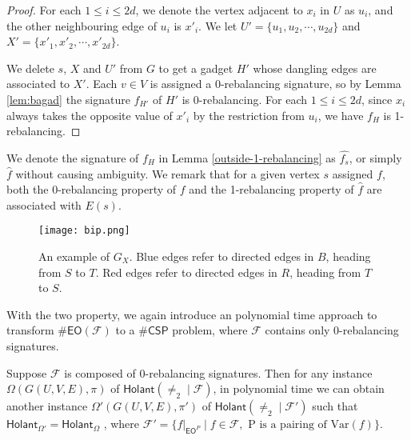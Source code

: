 \documentclass[a4paper,UKenglish,cleveref, autoref, thm-restate]{lipics-v2021}
\newcommand{\hol}[0]{\textsf{Holant}}
\newcommand{\eo}[0]{\textsf{EO}}
\newcommand{\csp}[0]{\textsf{CSP}}
\newcommand{\eom}[1][\text{M}]{\textsf{EO}^{#1}}
\newcommand{\ba}[1][0]{{{#1}-rebalancing}}
\begin{document}
\begin{proof}
For each $1\le i\le 2d$, we denote the vertex adjacent to $x_i$ in $U$ as $u_i$, and the other neighbouring edge of $u_i$ is $x'_i$. We let $U'=\{u_1,u_2, \cdots, u_{2d}\}$ and $X'=\{x'_1,x'_2, \cdots, x'_{2d}\}$.

We delete $s$, $X$ and $U'$ from $G$ to get a gadget $H'$ whose dangling edges are associated to $X'$. Each $v \in V$ is assigned a 0-rebalancing signature, so by Lemma \ref{lem:bagad} the signature $f_{H'}$ of $H'$ is \ba[0]. 
For each $1\le i\le 2d$, since $x_i$ always takes the opposite value of $x'_i$ by the restriction from $u_i$, we have $f_H$ is \ba[1].
\end{proof}


We denote the signature of $f_H$ in Lemma \ref{outside-1-rebalancing} as $\hat{f_s}$, or simply $\hat{f}$ without causing ambiguity.
We remark that for a given vertex $s$ assigned $f$, both the 0-rebalancing property of $f$ and the 1-rebalancing property of $\hat{f}$ are associated with $E(s)$. 



\begin{figure}
            \centering
            \texttt{[image: bip.png]}
            \caption{An example of $G_X$. Blue edges refer to directed edges in $B$, heading from $S$ to $T$. Red edges refer to directed edges in $R$, heading from $T$ to $S$.}
            \label{fig:bip}
        \end{figure}


With the two property, we again introduce an polynomial time approach to transform $\#\eo(\mathcal{F})$ to a $\#\csp$ problem, where $\mathcal{F}$ contains only \ba[0] signatures.


\begin{lemma}\label{lem:0rebtocsp}
Suppose $\mathcal{F}$ is composed of \ba[0] signatures. Then for any instance $\Omega(G(U,V,E),\pi)$ of $\hol(\neq_2\mid\mathcal{F})$, in polynomial time we can obtain another instance $\Omega'(G(U,V,E),\pi')$ of $\hol(\neq_2\mid\mathcal{F}')$ such that $\hol_{\Omega'}=\hol_\Omega$ , where $\mathcal{F}'=\{f|_{\eom[P]}\mid f\in\mathcal{F},\text{ P is a pairing of Var}(f)\}$. 
\end{lemma}
\end{document}
